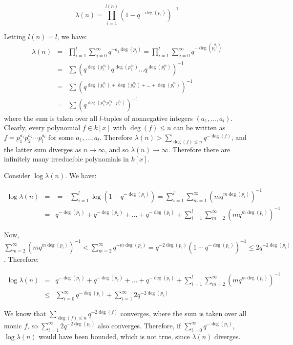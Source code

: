 \documentclass[notitlepage]{article}
\theoremstyle{definition}
\begin{document}
\begin{equation}
  \lambda(n) = \prod_{i=1}^{l(n)} \left(1-q^{-\deg(p_i)}\right)^{-1}
\end{equation}

Letting $l(n) = l$, we have:
\begin{eqnarray}
  \lambda(n) &=& \prod_{i=1}^{l} \sum_{j = 0}^\infty q^{-a_j
    \deg(p_i)} = \prod_{i=1}^{l} \sum_{j = 0}^\infty
  q^{-\deg(p_i^{a_j})} \\ &=& \sum \left(q^{\deg(p_1^{a_1})}
  q^{\deg(p_2^{a_2})} \ldots
  q^{\deg\left(p_{l}^{a_{l}}\right)}\right)^{-1} \\ &=& \sum
  \left(q^{\deg(p_1^{a_1})+\deg(p_2^{a_2})+ \ldots
    +\deg\left(p_{l}^{a_{l}}\right)}\right)^{-1} \\ &=& \sum
  \left(q^{\deg\left(p_1^{a_1}p_2^{a_2}\cdots p_{l}^{a_{l}}\right)}\right)^{-1}
\end{eqnarray}
where the sum is taken over all $l$-tuples of nonnegative integers
$(a_1, \ldots, a_l)$. Clearly, every polynomial $f \in k[x]$ with
$\deg(f) \leq n$ can be written as $f = p_1^{a_1}p_2^{a_2}\cdots
p_{l}^{a_{l}}$ for some $a_1, \ldots, a_l$. Therefore $\lambda(n) >
\sum_{\deg(f) \leq n} q^{-\deg(f)}$, and the latter sum diverges as $n
\to \infty$, and so $\lambda(n) \to \infty$. Therefore there are
infinitely many irreducible polynomials in $k[x]$.

Consider $\log \lambda(n)$. We have:

\begin{eqnarray}
  \log\lambda(n) &=&= -\sum_{i=1}^{l}
  \log\left(1-q^{-\deg(p_i)}\right) = \sum_{i=1}^{l}
  \sum_{m=1}^\infty (m q^{m\deg(p_i)})^{-1} \\ &=& q^{-\deg(p_1)} +
  q^{-\deg(p_2)} + \ldots + q^{-\deg(p_l)} + \sum_{i=1}^{l}
  \sum_{m=2}^\infty (m q^{m\deg(p_i)})^{-1}
\end{eqnarray}

Now, $\sum_{m=2}^\infty (m q^{m\deg(p_i)})^{-1} < \sum_{m=2}^\infty
q^{-m\deg(p_i)} = q^{-2\deg(p_i)}(1-q^{-\deg(p_i)})^{-1} \leq
2q^{-2\deg(p_i)}$. Therefore:

\begin{eqnarray}
  \log\lambda(n) &=& q^{-\deg(p_1)} + q^{-\deg(p_2)} + \ldots +
  q^{-\deg(p_l)} + \sum_{i=1}^{l} \sum_{m=2}^\infty (m
  q^{m\deg(p_i)})^{-1} \\ &\leq&\sum_{i=0}^\infty q^{-\deg(p_i)} + \sum_{i=1}^\infty 2 q^{-2\deg(p_i)}
\end{eqnarray}

We know that $\sum_{\deg(f) \leq n} q^{-2\deg(f)}$ converges, where
the sum is taken over all monic $f$, so $\sum_{i=1}^\infty 2
q^{-2\deg(p_i)}$ also converges. Therefore, if $\sum_{i=0}^\infty
q^{-\deg(p_i)}$, $\log \lambda(n)$ would have been bounded, which is
not true, since $\lambda(n)$ diverges.
\end{document}
